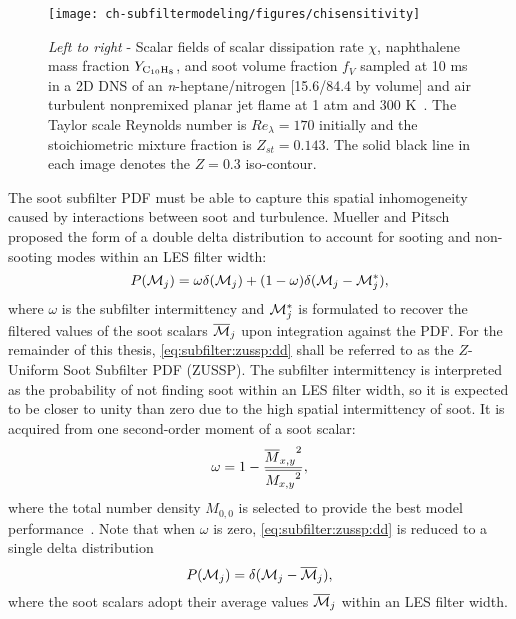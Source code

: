 \begin{figure}[htb]
  \centering
  \texttt{[image: ch-subfiltermodeling/figures/chisensitivity]}
  \caption[Spatial Variability of  and Soot Fields]{\textit{Left to right} - Scalar fields of scalar dissipation rate $\chi$, naphthalene mass fraction $Y_{\ce{C10H8}}$, and soot volume fraction $f_V$ sampled at 10 ms in a 2D DNS of an \textit{n}-heptane/nitrogen [15.6/84.4 by volume] and air turbulent nonpremixed planar jet flame at 1 atm and 300 K~\cite{bisetti2012}. The Taylor scale Reynolds number is $Re_{\lambda} = 170$ initially and the stoichiometric mixture fraction is $Z_{st} = 0.143$. The solid black line in each image denotes the $Z = 0.3$ iso-contour.} %
  \label{fig:subfilter:zussp:chisensitivity}
\end{figure}

The soot subfilter PDF must be able to capture this spatial inhomogeneity caused by interactions between soot and turbulence. Mueller and Pitsch~\cite{subfilterpdf2011} proposed the form of a double delta distribution to account for sooting and non-sooting modes within an LES filter width:
\begin{equation}\label{eq:subfilter:zussp:dd}
  P(\mathcal{M}_j) = \omega\delta(\mathcal{M}_j) + (1 - \omega)\delta(\mathcal{M}_j - \mathcal{M}_j^*),
\end{equation}
where $\omega$ is the subfilter intermittency and $\mathcal{M}_j^*$ is formulated to recover the filtered values of the soot scalars $\overline{\mathcal{M}}_j$ upon integration against the PDF. For the remainder of this thesis, \cref{eq:subfilter:zussp:dd} shall be referred to as the $Z$-Uniform Soot Subfilter PDF (ZUSSP). The subfilter intermittency is interpreted as the probability of not finding soot within an LES filter width, so it is expected to be closer to unity than zero due to the high spatial intermittency of soot. It is acquired from one second-order moment of a soot scalar:
\begin{equation}\label{eq:subfilter:zussp:omega}
  \omega = 1 - \frac{{\overline{M}_{x,y}}^2}{\overline{{M_{x,y}}^2}},
\end{equation}
where the total number density $M_{0,0}$ is selected to provide the best model performance~\cite{subfilterpdf2011}. Note that when $\omega$ is zero, \cref{eq:subfilter:zussp:dd} is reduced to a single delta distribution
\begin{equation}\label{eq:subfilter:zussp:sd}
  P(\mathcal{M}_j) = \delta(\mathcal{M}_j - \overline{\mathcal{M}}_j),
\end{equation}
where the soot scalars adopt their average values $\overline{\mathcal{M}}_j$ within an LES filter width.

